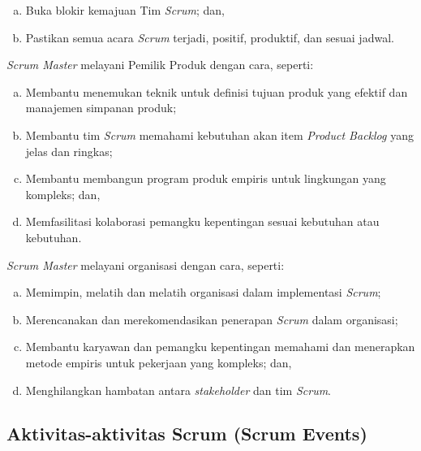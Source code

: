 \begin{enumerate}
\begin{enumerate}[a.]
			\item Buka blokir kemajuan Tim \emph{Scrum}; dan,

			\item Pastikan semua acara \emph{Scrum} terjadi, positif, produktif, dan sesuai jadwal.
		
		\end{enumerate}
		
		\emph{Scrum Master} melayani Pemilik Produk dengan cara, seperti:
		
		\begin{enumerate}[a.]
		
			\item Membantu menemukan teknik untuk definisi tujuan produk yang efektif dan manajemen simpanan produk;

			\item Membantu tim \emph{Scrum} memahami kebutuhan akan item \emph{Product Backlog} yang jelas dan ringkas;

			\item Membantu membangun program produk empiris untuk lingkungan yang kompleks; dan,

			\item Memfasilitasi kolaborasi pemangku kepentingan sesuai kebutuhan atau kebutuhan.
		
		\end{enumerate}
		
		\emph{Scrum Master} melayani organisasi dengan cara, seperti:
		
		\begin{enumerate}[a.]
		
			\item Memimpin, melatih dan melatih organisasi dalam implementasi \emph{Scrum};

			\item Merencanakan dan merekomendasikan penerapan \emph{Scrum} dalam organisasi;

			\item Membantu karyawan dan pemangku kepentingan memahami dan menerapkan metode empiris untuk pekerjaan yang kompleks; dan,

			\item Menghilangkan hambatan antara \emph{stakeholder} dan tim \emph{Scrum}.
		
		\end{enumerate}


	\end{enumerate}

	\subsection{Aktivitas-aktivitas Scrum (Scrum Events)}
	
